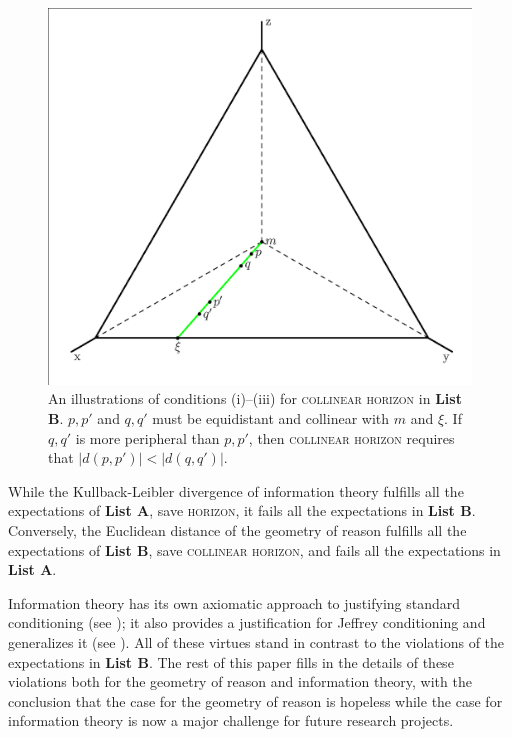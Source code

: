 \documentclass[12pt]{article}
\begin{document}
\begin{figure}[H]
  \begin{flushright}
    \begin{minipage}[h]{.7\linewidth}
      \includegraphics[width=\textwidth]{horeff.eps}
      \caption{\footnotesize An illustrations of conditions (i)--(iii)
        for \textsc{collinear horizon} in \textbf{List B}. $p,p'$ and $q,q'$
        must be equidistant and collinear with $m$ and $\xi$. If
        $q,q'$ is more peripheral than $p,p'$, then \textsc{collinear
          horizon} requires that $|d(p,p')|<|d(q,q')|$.}
      \label{fig:conditions}
    \end{minipage}
  \end{flushright}
\end{figure}

While the Kullback-Leibler divergence of information theory fulfills
all the expectations of \textbf{List A}, save \textsc{horizon}, it
fails all the expectations in \textbf{List B}. Conversely, the
Euclidean distance of the geometry of reason fulfills all the
expectations of \textbf{List B}, save \textsc{collinear horizon}, and
fails all the expectations in \textbf{List A}.

Information theory has its own axiomatic approach to justifying
standard conditioning (see ); it also
provides a justification for Jeffrey conditioning and generalizes it
(see ). All of these virtues stand in contrast to
the violations of the expectations in \textbf{List B}. The rest of
this paper fills in the details of these violations both for the
geometry of reason and information theory, with the conclusion that
the case for the geometry of reason is hopeless while the case for
information theory is now a major challenge for future research
projects.
\end{document}
